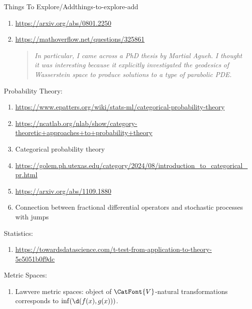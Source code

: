 \begin{remark}{Things To Explore/Add}{things-to-explore-add}
\begin{enumerate}
\begin{enumerate}
                \item Same question but for distributions
                \item non-symmetric metric on space of probability measures where we define $\mathrm{d}(\mu,\nu)$ to be the measure given by
                    \[
                        U%
                        \mapsto%
                        \int_{U}\rho_{\mu}\,\mathrm{d}\nu,%
                    \]%
                    where $\rho_{\mu}$ is the probability density of $\mu$. Can we make this idea work?
            \end{enumerate}
        \item \url{https://arxiv.org/abs/0801.2250}
        \item \url{https://mathoverflow.net/questions/325861}
            \begin{quote}
                \textit{In particular, I came across a PhD thesis by Martial Agueh. I thought it was interesting because it explicitly investigated the geodesics of Wasserstein space to produce solutions to a type of parabolic PDE.}
            \end{quote}
    \end{enumerate}
    Probability Theory:
    \begin{enumerate}
        \item \url{https://www.epatters.org/wiki/stats-ml/categorical-probability-theory}
        \item \url{https://ncatlab.org/nlab/show/category-theoretic+approaches+to+probability+theory}
        \item Categorical probability theory
        \item \url{https://golem.ph.utexas.edu/category/2024/08/introduction_to_categorical_pr.html}
        \item \url{https://arxiv.org/abs/1109.1880}
        \item Connection between fractional differential operators and stochastic processes with jumps
    \end{enumerate}
    Statistics:
    \begin{enumerate}
        \item \url{https://towardsdatascience.com/t-test-from-application-to-theory-5e5051b0f9dc}
    \end{enumerate}
    Metric Spaces:
    \begin{enumerate}
        \item Lawvere metric spaces: object of $\CatFont{V}$-natural transformations corresponds to $\inf(\d(f(x),g(x)))$.

\end{enumerate}
\end{remark}
